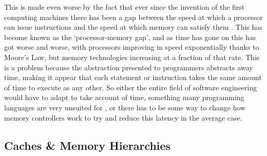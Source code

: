 
This is made even worse by the fact that ever since the invention of the first computing machines there has been a gap between the speed at which a processor can issue instructions and the speed at which memory can satisfy them \cite{wilkesMemoryGapFuture2001}. This has become known as the `processor-memory gap', and as time has gone on this has got worse and worse\cite{pattersonComputerOrganizationDesign2018}, with processors improving in speed exponentially thanks to Moore's Law, but memory technologies increasing at a fraction of that rate. This is a problem because the abstraction presented to programmers abstracts away time, making it appear that each statement or instruction takes the same amount of time to execute as any other. So either the entire field of software engineering would have to adapt to take account of time, something many programming languages are very unsuited for \cite{furiaModelingTimeComputing2010}, or there has to be some way to change how memory controllers work to try and reduce this latency in the average case.



\subsection{Caches \& Memory Hierarchies}

